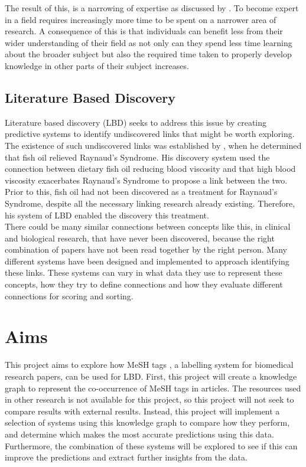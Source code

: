 \documentclass{l4proj}
\begin{document}
The result of this, is a narrowing of expertise as discussed by \cite{swanson_fish_1986}. To become expert in a field requires increasingly more time to be spent on a narrower area of research. A consequence of this is that individuals can benefit less from their wider understanding of their field as not only can they spend less time learning about the broader subject but also the required time taken to properly develop knowledge in other parts of their subject increases.\\ 

\subsection{Literature Based Discovery}

Literature based discovery (LBD) seeks to address this issue by creating predictive systems to identify undiscovered links that might be worth exploring. The existence of such undiscovered links was established by \cite{swanson_fish_1986}, when he determined that fish oil relieved Raynaud's Syndrome. His discovery system used the connection between dietary fish oil reducing blood viscosity and that high blood viscosity exacerbates Raynaud's Syndrome to propose a link between the two. Prior to this, fish oil had not been discovered as a treatment for Raynaud's Syndrome, despite all the necessary linking research already existing. Therefore, his system of LBD enabled the discovery this treatment. \\

There could be many similar connections between concepts like this, in clinical and biological research, that have never been discovered, because the right combination of papers have not been read together by the right person. Many different systems have been designed and implemented to approach identifying these links. These systems can vary in what data they use to represent these concepts, how they try to define connections and how they evaluate different connections for scoring and sorting. \\

\section{Aims}

This project aims to explore how MeSH tags \citep{mesh_home}, a labelling system for biomedical research papers, can be used for LBD. First, this project will create a knowledge graph to represent the co-occurrence of MeSH tags in articles. The resources used in other research is not available for this project, so this project will not seek to compare results with external results. Instead, this project will implement a selection of systems using this knowledge graph to compare how they perform, and determine which makes the most accurate predictions using this data. Furthermore, the combination of these systems will be explored to see if this can improve the predictions and extract further insights from the data. \\ 
\end{document}
